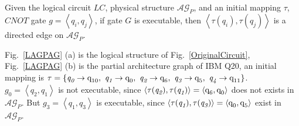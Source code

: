\documentclass[runningheads]{llncs}
\begin{document}
Given the logical circuit $LC$, physical structure $\mathcal{AG}_{P}$, 
and an initial mapping $\tau$, $CNOT$ gate $g=\left \langle \textit{q}_\textit{i},\textit{q}_\textit{j}\right \rangle $, 
if gate $G$ is executable, then $\left \langle\tau(\textit{q}_\textit{i}),\tau(\textit{q}_\textit{j})\right \rangle $ 
is a directed edge on $\mathcal{AG}_{P}$.

\begin{example}
	Fig.~\ref{LAGPAG} (a) is the logical structure of Fig.~\ref{OriginalCircuit}, 
	Fig.~\ref{LAGPAG} (b) is the partial architecture graph of IBM Q20, an initial mapping is 
	$\tau=\{\textit{q}_\textit{0}\rightarrow  \textup{q}_{\textup{10}},\ \textit{q}_\textit{1}\rightarrow \textup{q}_{\textup{0}},\ 
	\textit{q}_\textit{2}\rightarrow  \textup{q}_{\textup{6}},\ \textit{q}_\textit{3}\rightarrow  \textup{q}_{\textup{5}},\ \textit{q}_\textit{4}\rightarrow  \textup{q}_{\textup{11}}\}$.
	$g_{0}=\left \langle \textit{q}_\textit{2},\textit{q}_\textit{1}\right \rangle $ is not executable, since 
	$\left \langle \tau(\textit{q}_\textit{2}),\tau(\textit{q}_\textit{1})\right \rangle =\left \langle \textup{q}_{\textup{6}},\textup{q}_{\textup{0}}\right \rangle $ does not  exists in $\mathcal{AG}_{P}$.
	But $g_{3}=\left \langle \textit{q}_\textit{1},\textit{q}_\textit{3}\right \rangle $ is executable, since 
	$\left \langle \tau(\textit{q}_\textit{1}),\tau(\textit{q}_\textit{3})\right \rangle =\left \langle \textup{q}_{\textup{0}},\textup{q}_{\textup{5}}\right \rangle $  exist in $\mathcal{AG}_{P}$.
\end{example}
\end{document}
